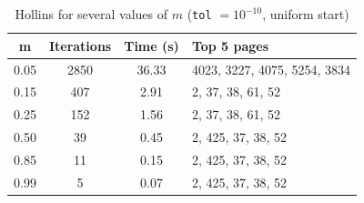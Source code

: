 \begin{table}[h]\centering
\begin{tabular}{cccl}
\toprule
\textbf{m} & \textbf{Iterations} & \textbf{Time (s)} & \textbf{Top 5 pages} \\
\midrule
0.05 & 2850 & 36.33 & 4023, 3227, 4075, 5254, 3834 \\
0.15 &  407 &  2.91 & 2, 37, 38, 61, 52 \\
0.25 &  152 &  1.56 & 2, 37, 38, 61, 52 \\
0.50 &   39 &  0.45 & 2, 425, 37, 38, 52 \\
0.85 &   11 &  0.15 & 2, 425, 37, 38, 52 \\
0.99 &    5 &  0.07 & 2, 425, 37, 38, 52 \\
\bottomrule
\end{tabular}
\caption{Hollins for several values of $m$ (\texttt{tol} $= 10^{-10}$, uniform start)}
\label{tab:ex17-hollins}
\end{table}


